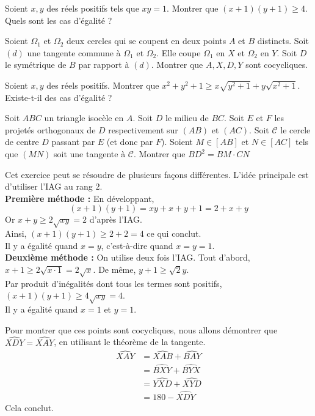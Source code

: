 \begin{exo}
Soient $x, y$ des réels positifs tels que $xy=1$. Montrer que $(x+1)(y+1) \geq 4$. Quels sont les cas d'égalité ?
\end{exo}


\begin{exo}
Soient $\Omega_1$ et $\Omega_2$ deux cercles qui se coupent en deux points $A$ et $B$ distincts. Soit $(d)$ une tangente commune à $\Omega_1$ et $\Omega_2$. Elle coupe $\Omega_1$ en $X$ et $\Omega_2$ en $Y$. Soit $D$ le symétrique de $B$ par rapport à $(d)$. Montrer que $A, X, D, Y$ sont cocycliques. 
\end{exo}


\begin{exo}
Soient $x, y$ des réels positifs. Montrer que $x^2+y^2+1 \geq x\sqrt{y^2+1} + y\sqrt{x^2+1}$. Existe-t-il des cas d'égalité ?
\end{exo}


\begin{exo}
Soit $ABC$ un triangle isocèle en $A$. Soit $D$ le milieu de $BC$. Soit $E$ et $F$ les projetés orthogonaux de $D$ respectivement sur $(AB)$ et $(AC)$. Soit $\mathcal{C}$ le cercle de centre $D$ passant par $E$ (et donc par $F$). Soient $M \in [AB]$ et $N \in [AC]$ tels que $(MN)$ soit une tangente à $\mathcal{C}$. Montrer que $BD^2= BM \cdot CN$
\end{exo}


\begin{sol}
Cet exercice peut se résoudre de plusieurs façons différentes. L'idée principale est d'utiliser l'IAG au rang $2$. \\
\textbf{Première méthode :} En développant, \\
$$(x + 1)(y + 1) = xy + x + y + 1 = 2 + x + y$$
Or $x+ y  \geq 2\sqrt{xy} = 2$ d'après l'IAG. \\
Ainsi, $(x + 1)(y + 1) \geq 2 + 2 = 4$ ce qui conclut. \\
Il y a égalité quand $x = y$, c'est-à-dire quand $x = y = 1$. \\
\textbf{Deuxième méthode :} On utilise deux fois l'IAG. Tout d'abord, $x + 1 \geq 2 \sqrt{x \cdot 1} = 2 \sqrt{x}$. De même, $y+1 \geq \sqrt 2{y}$. \\
Par produit d'inégalités dont tous les termes sont positifs, $(x+1)(y+1) \geq 4\sqrt{xy} = 4$. \\
Il y a égalité quand $x = 1$ et $y = 1$.
\end{sol}


\begin{sol}
Pour montrer que ces points sont cocycliques, nous allons démontrer que $\widehat{XDY} = \widehat{XAY}$, en utilisant le théorème de la tangente. 
\begin{align*} 
\widehat{XAY} &= \widehat{XAB}+ \widehat{BAY} \\
& = \widehat{BXY} + \widehat{BYX} \\
& = \widehat{YXD} + \widehat{XYD} \\ 
& = 180 - \widehat{XDY}
\end{align*}
Cela conclut. 
\end{sol}

